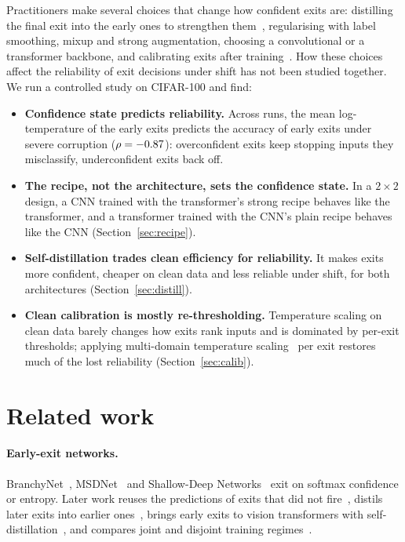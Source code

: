 \documentclass[10pt]{article}
\begin{document}
Practitioners make several choices that change how confident exits are: distilling the final exit into the early
ones to strengthen them~\citep{phuong2019distillation,zhang2019byot}, regularising with label smoothing, mixup and
strong augmentation, choosing a convolutional or a transformer backbone, and calibrating exits after
training~\citep{meronen2024fixing}. How these choices affect the reliability of exit decisions under shift has not
been studied together. We run a controlled study on CIFAR-100 and find:

\begin{itemize}
\item \textbf{Confidence state predicts reliability.} Across \nruns{} runs, the mean log-temperature of the early
exits predicts the accuracy of early exits under severe corruption ($\rho=-0.87$): overconfident exits keep
stopping inputs they misclassify, underconfident exits back off.
\item \textbf{The recipe, not the architecture, sets the confidence state.} In a $2\times2$ design, a CNN trained
with the transformer's strong recipe behaves like the transformer, and a transformer trained with the CNN's plain
recipe behaves like the CNN (Section~\ref{sec:recipe}).
\item \textbf{Self-distillation trades clean efficiency for reliability.} It makes exits more confident, cheaper on
clean data and less reliable under shift, for both architectures (Section~\ref{sec:distill}).
\item \textbf{Clean calibration is mostly re-thresholding.} Temperature scaling on clean data barely changes how
exits rank inputs and is dominated by per-exit thresholds; applying multi-domain temperature
scaling~\citep{yu2022multidomain} per exit restores much of the lost reliability (Section~\ref{sec:calib}).
\end{itemize}

\section{Related work}
\paragraph{Early-exit networks.} BranchyNet~\citep{teerapittayanon2016branchynet}, MSDNet~\citep{huang2018msdnet} and
Shallow-Deep Networks~\citep{kaya2019sdn} exit on softmax confidence or entropy. Later work reuses the predictions of
exits that did not fire~\citep{wolczyk2021ztw}, distils later exits into earlier
ones~\citep{phuong2019distillation,zhang2019byot}, brings early exits to vision transformers with
self-distillation~\citep{xu2023lgvit}, and compares joint and disjoint training regimes~\citep{kubaty2025train}.
\end{document}

